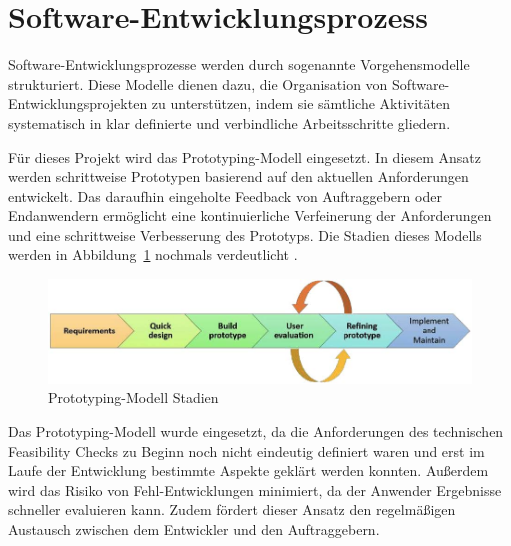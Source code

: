 \section{Software-Entwicklungsprozess}
Software-Entwicklungsprozesse werden durch sogenannte Vorgehensmodelle strukturiert. Diese Modelle dienen dazu, die Organisation von Software-Entwicklungsprojekten zu unterstützen, indem sie sämtliche Aktivitäten systematisch in klar definierte und verbindliche Arbeitsschritte gliedern.

Für dieses Projekt wird das Prototyping-Modell eingesetzt. In diesem Ansatz werden schrittweise Prototypen basierend auf den aktuellen Anforderungen entwickelt. Das daraufhin eingeholte Feedback von Auftraggebern oder Endanwendern ermöglicht eine kontinuierliche Verfeinerung der Anforderungen und eine schrittweise Verbesserung des Prototyps. Die Stadien dieses Modells werden in Abbildung~\ref{fig:Prototyping-Modell} nochmals verdeutlicht \cite{senarath2021waterfall}.

\begin{figure}[h!]
    \centering
    \includegraphics[]{bilder/Prototyping_Stages.jpg}
    \caption{Prototyping-Modell Stadien \cite{senarath2021waterfall}}
    \label{fig:Prototyping-Modell}
\end{figure}


Das Prototyping-Modell wurde eingesetzt, da die Anforderungen des technischen Feasibility Checks zu Beginn noch nicht eindeutig definiert waren und erst im Laufe der Entwicklung bestimmte Aspekte geklärt werden konnten. Außerdem wird das Risiko von Fehl-Entwicklungen minimiert, da der Anwender Ergebnisse schneller evaluieren kann. Zudem fördert dieser Ansatz den regelmäßigen Austausch zwischen dem Entwickler und den Auftraggebern.